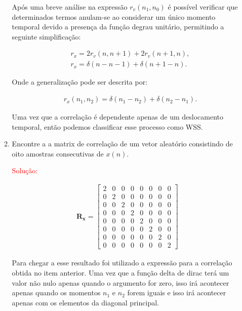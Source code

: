 \documentclass[a4paper,10pt]{article}
\begin{document}
\begin{enumerate}
\begin{enumerate}
				 		Após uma breve análise na expressão $r_{v}(n_{1},n_{0})$ é possível verificar que determinados termos anulam-se ao considerar um único momento temporal devido a presença da função degrau unitário, permitindo a seguinte simplificação:
				 		
				 		\begin{align}
				 			&r_{x} = 2r_{v}(n,n+1) + 2r_{v}(n+1,n), \\
				 			&r_{x} = \delta(n - n - 1) + \delta(n + 1 - n).
				 		\end{align}
				 		
				 		Onde a generalização pode ser descrita por:
				 		
				 		\begin{align}
				 			&r_{x}(n_{1}, n_{2})= \delta(n_{1} - n_{2}) + \delta(n_{2} - n_{1}).  
				 		\end{align}
				 		
				 		Uma vez que a correlação é dependente apenas de um deslocamento temporal, então podemos classificar esse processo como WSS.
			 		
			 		\item Encontre a a matrix de correlação de um vetor aleatório consistindo de oito amostras consecutivas de
			 		$x(n)$.
			 		
				 		\textcolor{red}{Solução:}
				 		
				 		\begin{align}
				 			\mathbf{R}_{\mathbf{x}} = \left[
				 			\begin{matrix}
				 				2 & 0 & 0 & 0 & 0 & 0 & 0 & 0\\
				 				0 & 2 & 0 & 0 & 0 & 0 & 0 & 0\\
				 				0 & 0 & 2 & 0 & 0 & 0 & 0 & 0\\
				 				0 & 0 & 0 & 2 & 0 & 0 & 0 & 0\\
				 				0 & 0 & 0 & 0 & 2 & 0 & 0 & 0\\
				 				0 & 0 & 0 & 0 & 0 & 2 & 0 & 0\\
				 				0 & 0 & 0 & 0 & 0 & 0 & 2 & 0\\
				 				0 & 0 & 0 & 0 & 0 & 0 & 0 & 2
				 			\end{matrix}
				 			\right]
				 		\end{align}
				 		
				 		Para chegar a esse resultado foi utilizado a expressão para a correlação obtida no item anterior. Uma vez que a função delta de dirac terá um valor não nulo apenas quando o argumento for zero, isso irá acontecer apenas quando os momentos $n_{1}$ e $n_{2}$ forem iguais e isso irá acontecer apenas com os elementos da diagonal principal.
			 		
			 	\end{enumerate}
		 	
		\end{enumerate}
		
\end{document}
